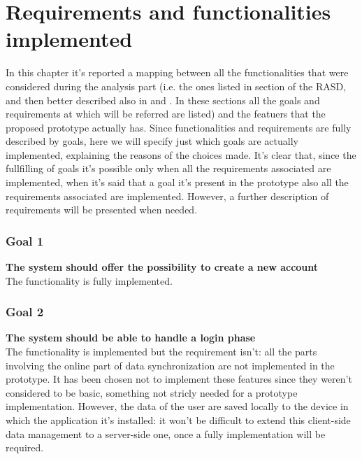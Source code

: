 \chapter{Requirements and functionalities implemented} \label{chap:reqAndFuct}

In this chapter it's reported a mapping between all the functionalities that were considered during the analysis part (i.e. the ones listed in section  of the RASD, and then better described also in  and . In these sections all the goals and requirements at which will be referred are listed) and the featuers that the proposed prototype actually has. Since functionalities and requirements are fully described by goals, here we will specify just which goals are actually implemented, explaining the reasons of the choices made.
It's clear that, since the fullfilling of goals it's possible only when all the requirements associated are implemented, when it's said that a goal it's present in the prototype also all the requirements associated are implemented.
However, a further description of requirements will be presented when needed.

\subsection{Goal 1} \label{subsect:gNewAccount}
\textbf{The system should offer the possibility to create a new account}\\

The functionality is fully implemented.

\subsection{Goal 2} \label{subsect:gLoginPhase}
\textbf{The system should be able to handle a login phase}\\

The functionality is implemented but the requirement  isn't: all the parts involving the online part of data synchronization are not implemented in the prototype. It has been chosen not to implement these features since they weren't considered to be basic, something not stricly needed for a prototype implementation. However, the data of the user are saved locally to the device in which the application it's installed: it won't be difficult to extend this client-side data management to a server-side one, once a fully implementation will be required.

